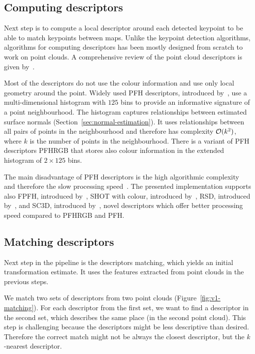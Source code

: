 \subsection{Computing descriptors}
\label{sec:compute-descriptors}

Next step is to compute a local descriptor around each detected keypoint to be able to match keypoints between maps. Unlike the keypoint detection algorithms, algorithms for computing descriptors has been mostly designed from scratch to work on point clouds. A comprehensive review of the point cloud descriptors is given by~\citet{YasirThesis}.

Most of the descriptors do not use the colour information and use only local geometry around the point. Widely used \gls{PFH} descriptors, introduced by~\citet{rusu2008pfh}, use a multi-dimensional histogram with $125$ bins to provide an informative signature of a point neighbourhood. The histogram captures relationships between estimated surface normals (Section~\ref{sec:normal-estimation}). It uses relationships between all pairs of points in the neighbourhood and therefore has complexity $\operatorname{\mathcal{O}}(k^2)$, where $k$ is the number of points in the neighbourhood. There is a variant of \gls{PFH} descriptors \gls{PFHRGB} that stores also colour information in the extended histogram of $2 \times 125$ bins.

The main disadvantage of \gls{PFH} descriptors is the high algorithmic complexity and therefore the slow processing speed~\citep{rusu2009fpfh}. The presented implementation supports also \gls{FPFH}, introduced by~\citet{rusu2009fpfh}, \gls{SHOT} with colour, introduced by~\citet{tombari2011shot}, \gls{RSD}, introduced by~\citet{marton2010rsd}, and \gls{SC3D}, introduced by~\citet{frome2004sc3d}, novel descriptors which offer better processing speed compared to \gls{PFHRGB} and \gls{PFH}.

\subsection{Matching descriptors}
\label{sec:matching}

Next step in the pipeline is the descriptors matching, which yields an initial transformation estimate. It uses the features extracted from point clouds in the previous steps.

We match two sets of descriptors from two point clouds (Figure~\ref{fig:v1-matching}). For each descriptor from the first set, we want to find a descriptor in the second set, which describes the same place (in the second point cloud). This step is challenging because the descriptors might be less descriptive than desired. Therefore the correct match might not be always the closest descriptor, but the $k$-nearest descriptor.

